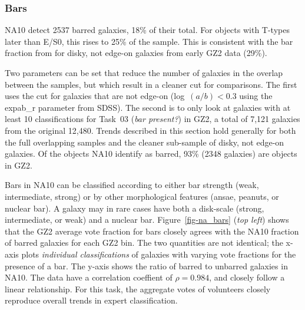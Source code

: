 \documentclass[useAMS,usenatbib]{mn2e}
\begin{document}
\subsubsection{Bars}

NA10 detect 2537 barred galaxies, 18\% of their total. For objects with T-types later than E/S0, this rises to 25\% of the sample. This is consistent with the bar fraction from \citep{mas11c} for disky, not edge-on galaxies from early GZ2 data (29\%). 

Two parameters can be set that reduce the number of galaxies in the overlap between the samples, but which result in a cleaner cut for comparisons. The first uses the \citet{mas11c} cut for galaxies that are not edge-on (log~$(a/b) < 0.3$ using the {\sc expab\_r} parameter from SDSS). The second is to only look at galaxies with at least 10 classifications for Task~03 ({\it bar present?}) in GZ2, a total of 7,121 galaxies from the original 12,480. Trends described in this section hold generally for both the full overlapping samples and the cleaner sub-sample of disky, not edge-on galaxies. Of the objects NA10 identify as barred, 93\% (2348 galaxies) are objects in GZ2. 

Bars in NA10 can be classified according to either bar strength (weak, intermediate, strong) or by other morphological features (ansae, peanuts, or nuclear bar). A galaxy may in rare cases have both a disk-scale (strong, intermediate, or weak) and a nuclear bar. Figure~\ref{fig-na_bars} ({\it top left}) shows that the GZ2 average vote fraction for bars closely agrees with the NA10 fraction of barred galaxies for each GZ2 bin. The two quantities are not identical; the x-axis plots {\it individual classifications} of galaxies with varying vote fractions for the presence of a bar. The y-axis shows the ratio of barred to unbarred galaxies in NA10. The data have a correlation coeffient of $\rho=0.984$, and closely follow a linear relationship. For this task, the aggregate votes of volunteers closely reproduce overall trends in expert classification. 
\end{document}
